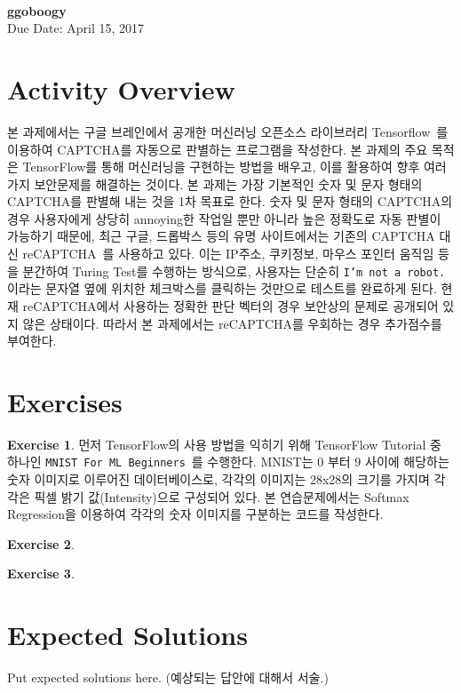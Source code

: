 \documentclass[a4paper, 11pt]{article}
\theoremstyle{definition}
\newtheorem{exercise}{Exercise}
\begin{document}
 \\
         {\phantom{} \hfill \textbf{ggoboogy}} \\
         {\phantom{} \hfill Due Date: April 15, 2017} \\

\section{Activity Overview}
본 과제에서는 구글 브레인에서 공개한 머신러닝 오픈소스 라이브러리 Tensorflow~\cite{tensorflow}를 이용하여 CAPTCHA를 자동으로 판별하는 프로그램을 작성한다. 본 과제의 주요 목적은 TensorFlow를 통해 머신러닝을 구현하는 방법을 배우고, 이를 활용하여 향후 여러가지 보안문제를 해결하는 것이다. 본 과제는 가장 기본적인 숫자 및 문자 형태의 CAPTCHA를 판별해 내는 것을 1차 목표로 한다. 숫자 및 문자 형태의 CAPTCHA의 경우 사용자에게 상당히 annoying한 작업일 뿐만 아니라 높은 정확도로 자동 판별이 가능하기 때문에, 최근 구글, 드롭박스 등의 유명 사이트에서는 기존의 CAPTCHA 대신 reCAPTCHA~\cite{recaptcha}를 사용하고 있다. 이는 IP주소, 쿠키정보, 마우스 포인터 움직임 등을 분간하여 Turing Test를 수행하는 방식으로, 사용자는 단순히 \texttt{I'm not a robot.} 이라는 문자열 옆에 위치한 체크박스를 클릭하는 것만으로 테스트를 완료하게 된다. 현재 reCAPTCHA에서 사용하는 정확한 판단 벡터의 경우 보안상의 문제로 공개되어 있지 않은 상태이다. 따라서 본 과제에서는 reCAPTCHA를 우회하는 경우 추가점수를 부여한다. 

\section{Exercises}

\begin{exercise}
먼저 TensorFlow의 사용 방법을 익히기 위해 TensorFlow Tutorial 중 하나인 \texttt{MNIST For ML Beginners}~\cite{tftutorial}를 수행한다. MNIST는 0 부터 9 사이에 해당하는 숫자 이미지로 이루어진 데이터베이스로, 각각의 이미지는 28x28의 크기를 가지며 각각은 픽셀 밝기 값(Intensity)으로 구성되어 있다. 본 연습문제에서는 Softmax Regression을 이용하여 각각의 숫자 이미지를 구분하는 코드를 작성한다. 
\end{exercise}

\begin{exercise}


\end{exercise}

\begin{exercise}


\end{exercise}

\section{Expected Solutions}

Put expected solutions here.
(예상되는 답안에 대해서 서술.)



\end{document}
